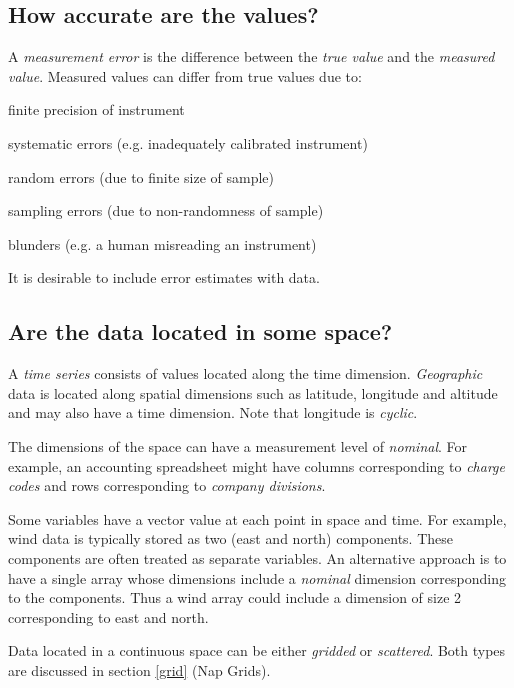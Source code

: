 \subsection{How accurate are the values?}

A \textit{measurement error} is the difference between the 
  \textit{true value} and the 
  \textit{measured value}. Measured values can differ from true values
  due to:
\begin{bullets}
    \item finite precision of instrument
    \item systematic errors (e.g. inadequately calibrated
    instrument)
    \item random errors (due to finite size of sample)
    \item sampling errors (due to non-randomness of sample)
    \item blunders (e.g. a human misreading an instrument)
\end{bullets}
It is desirable to include error estimates with data.

\subsection{Are the data located in some space?}

A \textit{time series} consists of values located along the time
  dimension. 
  \textit{Geographic} data is located along spatial dimensions such as
  latitude, longitude and altitude and may also have a time dimension.
  Note that longitude is 
  \textit{cyclic}.

The dimensions of the space can have a measurement level of \textit{nominal}.
For example, an accounting spreadsheet might have columns corresponding to 
\textit{charge codes} and rows corresponding to \textit{company divisions}.

Some variables have a vector value at each point in space and time.
For example, wind data is typically stored as two (east and north) components. 
These components are often treated as separate variables.
An alternative approach is to have a single array whose dimensions include a
\textit{nominal} dimension corresponding to the components.
Thus a wind array could include a dimension of size 2 corresponding to east and north.

Data located in a continuous space can be either 
  \textit{gridded} or 
  \textit{scattered}. Both types are discussed in section \ref{grid} (Nap Grids).
